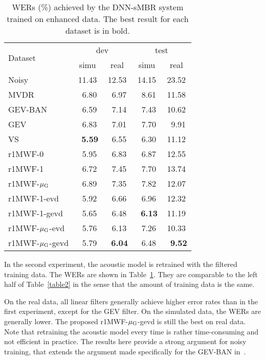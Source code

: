 \documentclass[review]{elsarticle}
\begin{document}
\begin{table}[!ht]
\caption{WERs (\%) achieved by the DNN-sMBR system trained on enhanced data. The best result for each dataset is in bold.}
\label{table3}
\begin{center}
\begin{tabular}{|l|c|c|c|c|}
  \hline
  \multirow{2}{*}{Dataset} & \multicolumn{2}{c|}{dev} & \multicolumn{2}{c|}{test} \\ \cline{2-5}
                & simu & real       & simu  & real   \\ \hline \hline
  Noisy         & 11.43& 12.53  & 14.15 &23.52 \\ \hline
  MVDR          & ~6.80	&~6.97	&~8.61	&11.58  \\ \hline
  GEV-BAN       & ~6.59	&~7.14	&~7.43	&10.62  \\ \hline
  GEV           & ~6.83	&~7.01	&~7.70	&~9.91  \\ \hline
  VS          &\bf ~5.59 &~6.55  &~6.30	&11.12    \\ \hline \hline

  r1MWF-0       & ~5.95	&~6.83	&~6.87	&12.55    \\ \hline
  r1MWF-1       & ~6.72	&~7.45	&~7.70	&13.74  \\ \hline
  r1MWF-$\mu_{\text G}$     & ~6.89	&~7.35	&~7.82	&12.07    \\ \hline \hline

  r1MWF-1-evd   & ~5.92	&~6.66	&~6.96	&12.32    \\ \hline
  r1MWF-1-gevd  & ~5.65	&~6.48  &\bf ~6.13 &11.19    \\ \hline
  r1MWF-$\mu_{\text G}$-evd & ~5.76	&~6.13	&~7.26	&10.33   \\ \hline
  r1MWF-$\mu_{\text G}$-gevd &~5.79	&\bf ~6.04 &~6.48 &\bf ~9.52   \\ \hline
\end{tabular}
\end{center}
\end{table}

In the second experiment, the acoustic model is retrained with the filtered training data. The WERs are shown in Table~\ref{table3}. They are comparable to the left half of Table~\ref{table2} in the sense that the amount of training data is the same.

On the real data, all linear filters generally achieve higher error rates than in the first experiment, except for the GEV filter. On the simulated data, the WERs are generally lower. The proposed r1MWF-$\mu_{\text G}$-gevd is still the best on real data. Note that retraining the acoustic model every time is rather time-consuming and not efficient in practice. The results here provide a strong argument for noisy training, that extends the argument made specifically for the GEV-BAN in~\cite{2016icasspBLSTM}.
\end{document}
